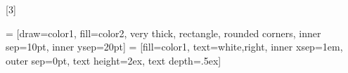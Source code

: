 
\let\oldvec\vec
\renewcommand{\vec}[1]{\bm{#1}} %
\newcommand{\vecf}[1]{\bm{#1}} %
\newcommand{\vecelem}[1]{#1}
\newcommand{\vecarrow}[1]{\vv{#1}}
\newcommand{\mat}[1]{\bm{#1}}
\newcommand{\matelem}[1]{\mathit{#1}}
\newcommand{\ten}[1]{\mathbf{#1}}
\newcommand{\tenelem}[1]{\mathrm{#1}}
\newcommand{\set}[1]{\mathbb{#1}}
\newcommand{\fspace}[1]{\mathcal{#1}}

\newcommand{\trans}[1]{#1^{\mathsf{T}}}
\newcommand{\ifrac}[2]{\sfrac{#1}{#2}}
\newcommand{\deriv}[2]{\frac{\text{d}#1}{\text{d}#2}}
\newcommand{\partderiv}[2]{\frac{\partial #1}{\partial #2}}
\newcommand{\ideriv}[2]{\ifrac{\text{d}#1}{\text{d}#2}}
\newcommand{\ipartderiv}[2]{\ifrac{\partial #1}{\partial #2}}

\DeclarePairedDelimiter{\norm}{\lVert}{\rVert}


\newcommand{\param}{\lambda}


\newcommand{\keyword}[1]{\textbf{#1}}
\newcommand{\para}{\par\medskip}
\newcommand{\ds}{\displaystyle}

\newcommand{\keycode}[1]{\texttt{#1}}
\newcommand{\code}[1]{\texttt{#1}}


\let\oldcite\cite
\renewcommand{\cite}[1]{{\color{red}(\oldcite{#1})}\\}





[3]
{

   = [draw=color1, fill=color2, very thick, rectangle, rounded corners, inner sep=10pt, inner ysep=20pt]
   = [fill=color1, text=white,right, inner xsep=1em, outer sep=0pt, text height=2ex, text depth=.5ex]
}

